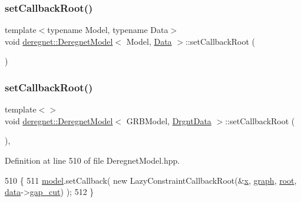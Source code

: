 \subsubsection{\texorpdfstring{set\+Callback\+Root()}{setCallbackRoot()}\hspace{0.1cm}{\footnotesize\ttfamily [1/3]}}
{\footnotesize\ttfamily template$<$typename Model, typename Data$>$ \\
void \hyperlink{classderegnet_1_1DeregnetModel}{deregnet\+::\+Deregnet\+Model}$<$ Model, \hyperlink{avgdrgnt_8cpp_a1d1235306db276e9b36acba1db1509e8}{Data} $>$\+::set\+Callback\+Root (\begin{DoxyParamCaption}{ }\end{DoxyParamCaption})\hspace{0.3cm}{\ttfamily [private]}}

\mbox{\label{classderegnet_1_1DeregnetModel_a8f10c7fabb80842cd27eb10d31289bbb}} 
\subsubsection{\texorpdfstring{set\+Callback\+Root()}{setCallbackRoot()}\hspace{0.1cm}{\footnotesize\ttfamily [2/3]}}
{\footnotesize\ttfamily template$<$$>$ \\
void \hyperlink{classderegnet_1_1DeregnetModel}{deregnet\+::\+Deregnet\+Model}$<$ G\+R\+B\+Model, \hyperlink{classderegnet_1_1DrgntData}{Drgnt\+Data} $>$\+::set\+Callback\+Root (\begin{DoxyParamCaption}{ }\end{DoxyParamCaption})\hspace{0.3cm}{\ttfamily [inline]}, {\ttfamily [private]}}



Definition at line 510 of file Deregnet\+Model.\+hpp.


\begin{DoxyCode}
510                                                          \{
511     \hyperlink{classderegnet_1_1DeregnetModel_a30d525de2086e342b33fe3e45ede4947}{model}.setCallback( \textcolor{keyword}{new} LazyConstraintCallbackRoot(&\hyperlink{classderegnet_1_1DeregnetModel_a360c980f3fec4dfbab50e9bb06a933a8}{x}, \hyperlink{classderegnet_1_1DeregnetModel_a3cd2f54b8e061ef5bed32708d9bc1ef1}{graph}, \hyperlink{classderegnet_1_1DeregnetModel_a54b20393a0e26d65935d387685d7fe96}{root}, 
      \hyperlink{classderegnet_1_1DeregnetModel_ad5399761cf6293a702f3800bda4806d1}{data}->\hyperlink{classderegnet_1_1DeregnetData_a3637c87366454adc152487fc2f5cfede}{gap\_cut}) );
512 \}
\end{DoxyCode}
\mbox{\label{classderegnet_1_1DeregnetModel_a1d62ef7fd28d6316d549712bf9214e54}} 

